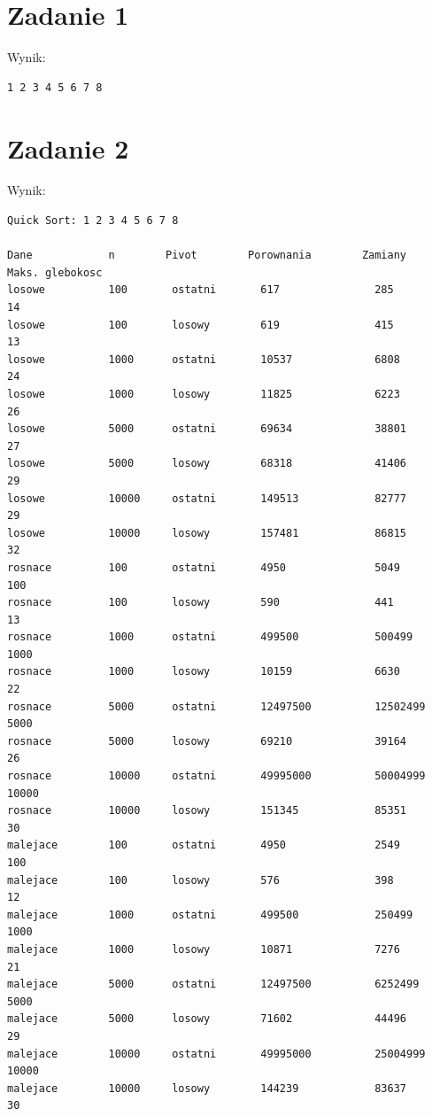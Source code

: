 \documentclass[10pt,a4paper]{article}
\begin{document}
\section*{Zadanie 1}
\noindent Wynik:
\begin{verbatim}
1 2 3 4 5 6 7 8
\end{verbatim}

\section*{Zadanie 2}
\noindent Wynik:
\begin{verbatim}
Quick Sort: 1 2 3 4 5 6 7 8

Dane            n        Pivot        Porownania        Zamiany   Maks. glebokosc
losowe          100       ostatni       617               285                14
losowe          100       losowy        619               415                13
losowe          1000      ostatni       10537             6808               24
losowe          1000      losowy        11825             6223               26
losowe          5000      ostatni       69634             38801              27
losowe          5000      losowy        68318             41406              29
losowe          10000     ostatni       149513            82777              29
losowe          10000     losowy        157481            86815              32
rosnace         100       ostatni       4950              5049               100
rosnace         100       losowy        590               441                13
rosnace         1000      ostatni       499500            500499             1000
rosnace         1000      losowy        10159             6630               22
rosnace         5000      ostatni       12497500          12502499           5000
rosnace         5000      losowy        69210             39164              26
rosnace         10000     ostatni       49995000          50004999           10000
rosnace         10000     losowy        151345            85351              30
malejace        100       ostatni       4950              2549               100
malejace        100       losowy        576               398                12
malejace        1000      ostatni       499500            250499             1000
malejace        1000      losowy        10871             7276               21
malejace        5000      ostatni       12497500          6252499            5000
malejace        5000      losowy        71602             44496              29
malejace        10000     ostatni       49995000          25004999           10000
malejace        10000     losowy        144239            83637              30
\end{verbatim}
\end{document}
